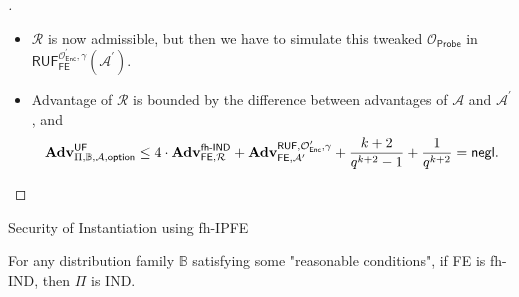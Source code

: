 \begin{frame}{}

\begin{proof}[]

\begin{itemize}
	
	\item<1-> $\mathcal{R}$ is now admissible, but then we have to simulate this tweaked $\mathcal{O}_{\textsf{Probe}}$ in $\textsf{RUF}^{\mathcal{O}^\prime_{\textsf{Enc}}, \gamma}_{\textsf{FE}}(\mathcal{A}^\prime)$.

	\item<2-> Advantage of $\mathcal{R}$ is bounded by the difference between advantages of $\mathcal{A}$ and $\mathcal{A}^\prime$, and
	\[
		\mathbf{Adv}^{\textsf{UF}}_{\Pi, \mathbb{B}, \mathcal{A}, \textsf{option}} \leq 4 \cdot \mathbf{Adv}_{\textsf{FE}, \mathcal{R}}^{\textsf{fh-IND}} + \mathbf{Adv}_{\textsf{FE}, \mathcal{A}^\prime}^{\textsf{RUF}, \mathcal{O}^\prime_{\textsf{Enc}}, \gamma} + \frac{k+2}{q^{k+2}-1} + \frac{1}{q^{k+2}} = \mathsf{negl}.
	\]
\end{itemize}
\end{proof}

\end{frame}



\begin{frame}{Security of Instantiation using fh-IPFE}

{}

\begin{theorem}
{}
\end{theorem}


\begin{theorem}
{}
\end{theorem}


\begin{theorem}
	For any distribution family $\mathbb{B}$ satisfying some "reasonable conditions", if \textsf{FE} is fh-IND, then $\Pi$ is IND.
\end{theorem}

\end{frame}


